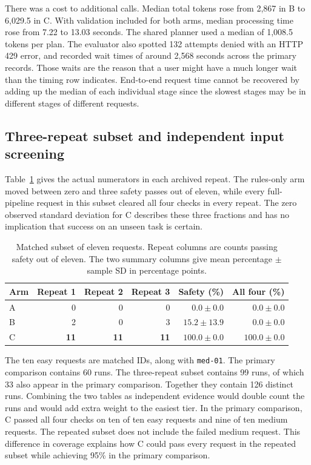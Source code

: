 \documentclass[12pt,onecolumn,draftclsnofoot]{IEEEtran}
\begin{document}
There was a cost to additional calls. Median total tokens rose from 2,867 in B to 6,029.5 in C. With validation included for both arms, median processing time rose from 7.22 to 13.03 seconds. The shared planner used a median of 1,008.5 tokens per plan. The evaluator also spotted 132 attempts denied with an HTTP 429 error, and recorded wait times of around 2,568 seconds across the primary records. Those waits are the reason that a user might have a much longer wait than the timing row indicates. End-to-end request time cannot be recovered by adding up the median of each individual stage since the slowest stages may be in different stages of different requests.

\subsection{Three-repeat subset and independent input screening}
Table~\ref{tab:repeat} gives the actual numerators in each archived repeat. The rules-only arm moved between zero and three safety passes out of eleven, while every full-pipeline request in this subset cleared all four checks in every repeat. The zero observed standard deviation for C describes these three fractions and has no implication that success on an unseen task is certain.
\begin{table}[htbp]\centering
\caption{Matched subset of eleven requests. Repeat columns are counts passing safety out of eleven. The two summary columns give mean percentage $\pm$ sample SD in percentage points.}
\label{tab:repeat}\small
\begin{tabular}{@{}lrrrrr@{}}\toprule
Arm & Repeat 1 & Repeat 2 & Repeat 3 & Safety (\%) & All four (\%)\\\midrule
A & 0 & 0 & 0 & $0.0\pm0.0$ & $0.0\pm0.0$\\
B & 2 & 0 & 3 & $15.2\pm13.9$ & $0.0\pm0.0$\\
C & \textbf{11} & \textbf{11} & \textbf{11} & $\mathbf{100.0\pm0.0}$ & $\mathbf{100.0\pm0.0}$\\\bottomrule
\end{tabular}
\end{table}

The ten easy requests are matched IDs, along with \texttt{med-01}. The primary comparison contains 60 runs. The three-repeat subset contains 99 runs, of which 33 also appear in the primary comparison. Together they contain 126 distinct runs. Combining the two tables as independent evidence would double count the runs and would add extra weight to the easiest tier. In the primary comparison, C passed all four checks on ten of ten easy requests and nine of ten medium requests. The repeated subset does not include the failed medium request. This difference in coverage explains how C could pass every request in the repeated subset while achieving 95\% in the primary comparison.
\end{document}
